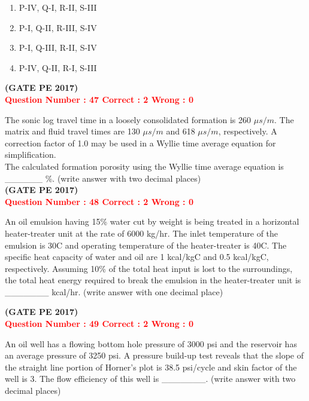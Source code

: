 \documentclass[journal,12pt,onecolumn]{article}
\begin{document}
{\begin{enumerate}[label=(\Alph*)]
    \item P-IV, Q-I, R-II, S-III \\
    \item P-I, Q-II, R-III, S-IV \\
    \item P-I, Q-III, R-II, S-IV \\
    \item P-IV, Q-II, R-I, S-III
\end{enumerate}

\hfill\textbf{(GATE PE 2017)}\\[0.6cm]

\textcolor{red}{\textbf{Question Number : 47 \hfill Correct : 2  Wrong : 0}}

The sonic log travel time in a loosely consolidated formation is 260 $\mu s/m$. The matrix and fluid travel times are 130 $\mu s/m$ and 618 $\mu s/m$, respectively. A correction factor of 1.0 may be used in a Wyllie time average equation for simplification.\\[1ex]

The calculated formation porosity using the Wyllie time average equation is \_\_\_\_\_\_ \%. (write answer with two decimal places)\\

\hfill\textbf{(GATE PE 2017)}\\[0.6cm]

\textcolor{red}{\textbf{Question Number : 48 \hfill Correct : 2  Wrong : 0}}

An oil emulsion having 15\% water cut by weight is being treated in a horizontal heater-treater unit at the rate of 6000 kg/hr. The inlet temperature of the emulsion is 30\textdegree C and operating temperature of the heater-treater is 40\textdegree C. The specific heat capacity of water and oil are 1 kcal/kg\textdegree C and 0.5 kcal/kg\textdegree C, respectively. Assuming 10\% of the total heat input is lost to the surroundings, the total heat energy required to break the emulsion in the heater-treater unit is \_\_\_\_\_\_\_ kcal/hr. (write answer with one decimal place)

\hfill\textbf{(GATE PE 2017)}\\[0.6cm]


\textcolor{red}{\textbf{Question Number : 49 \hfill Correct : 2  Wrong : 0}}

An oil well has a flowing bottom hole pressure of 3000 psi and the reservoir has an average pressure of 3250 psi. A pressure build-up test reveals that the slope of the straight line portion of Horner’s plot is 38.5 psi/cycle and skin factor of the well is 3. The flow efficiency of this well is \_\_\_\_\_\_\_. (write answer with two decimal places)\\

}
\end{document}
